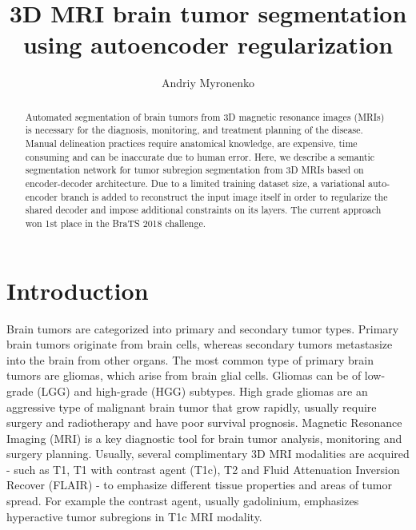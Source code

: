 \documentclass[runningheads]{llncs}
\begin{document}
\renewcommand{\arraystretch}{1.4}
\setlength{\tabcolsep}{0.3em}

\title{3D MRI brain tumor segmentation using autoencoder regularization}
\author{Andriy Myronenko}
%
\maketitle              %
%
\begin{abstract}

Automated segmentation of brain tumors from 3D magnetic resonance images (MRIs) is necessary for the diagnosis, monitoring, and treatment planning of the disease. Manual delineation practices require anatomical knowledge, are expensive, time consuming and can be inaccurate due to human error. Here, we describe a semantic segmentation network for tumor subregion segmentation from 3D MRIs based on encoder-decoder architecture.  Due to a limited training dataset size, a variational auto-encoder branch is added to reconstruct the input image itself in order to regularize the shared decoder and impose additional constraints on its layers. The current approach won 1st place in the BraTS 2018 challenge. 

\end{abstract}



\section{Introduction}

Brain tumors are categorized into primary and secondary tumor types.  Primary brain tumors 	 originate from brain cells, whereas  secondary tumors metastasize into the brain from other organs. The most common type of primary brain tumors are gliomas, which arise from brain glial cells.  Gliomas can be of low-grade  (LGG) and high-grade (HGG) subtypes. High grade gliomas are an aggressive  type of malignant brain tumor that grow rapidly, usually require surgery and radiotherapy and have poor survival prognosis. Magnetic Resonance Imaging (MRI) is a key diagnostic tool for brain tumor analysis, monitoring and surgery planning. Usually, several complimentary 3D MRI modalities are acquired - such as T1, T1 with contrast agent (T1c), T2 and Fluid Attenuation Inversion Recover (FLAIR) - to emphasize different tissue properties and areas of tumor spread.  For example the contrast agent, usually gadolinium, emphasizes hyperactive tumor subregions in T1c MRI modality.  
\end{document}
